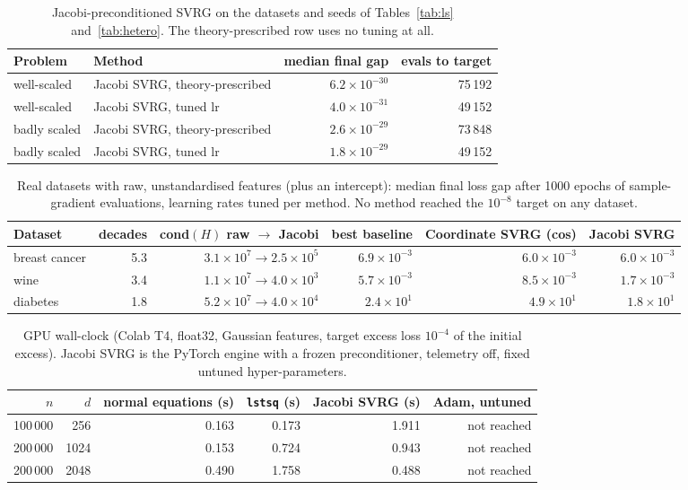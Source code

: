 \begin{table}[h]
\centering
\small
\begin{tabular}{@{}llrr@{}}
\toprule
Problem & Method & median final gap & evals to target \\
\midrule
well-scaled & Jacobi SVRG, theory-prescribed & $6.2\times 10^{-30}$ & 75\,192 \\
well-scaled & Jacobi SVRG, tuned lr & $4.0\times 10^{-31}$ & 49\,152 \\
badly scaled & Jacobi SVRG, theory-prescribed & $2.6\times 10^{-29}$ & 73\,848 \\
badly scaled & Jacobi SVRG, tuned lr & $1.8\times 10^{-29}$ & 49\,152 \\
\bottomrule
\end{tabular}
\caption{Jacobi-preconditioned SVRG on the datasets and seeds of Tables~\ref{tab:ls} and~\ref{tab:hetero}. The theory-prescribed row uses no tuning at all.}
\label{tab:jacobi}
\end{table}

\begin{table}[h]
\centering
\small
\begin{tabular}{@{}lrrrrr@{}}
\toprule
Dataset & decades & cond$(H)$ raw $\to$ Jacobi & best baseline & Coordinate SVRG (cos) & Jacobi SVRG \\
\midrule
breast cancer & 5.3 & $3.1\times 10^{7}\to 2.5\times 10^{5}$ & $6.9\times 10^{-3}$ & $6.0\times 10^{-3}$ & $6.0\times 10^{-3}$ \\
wine & 3.4 & $1.1\times 10^{7}\to 4.0\times 10^{3}$ & $5.7\times 10^{-3}$ & $8.5\times 10^{-3}$ & $1.7\times 10^{-3}$ \\
diabetes & 1.8 & $5.2\times 10^{7}\to 4.0\times 10^{4}$ & $2.4\times 10^{1}$ & $4.9\times 10^{1}$ & $1.8\times 10^{1}$ \\
\bottomrule
\end{tabular}
\caption{Real datasets with raw, unstandardised features (plus an intercept): median final loss gap after 1000 epochs of sample-gradient evaluations, learning rates tuned per method. No method reached the $10^{-8}$ target on any dataset.}
\label{tab:real}
\end{table}

\begin{table}[h]
\centering
\small
\begin{tabular}{@{}rrrrrr@{}}
\toprule
$n$ & $d$ & normal equations (s) & \texttt{lstsq} (s) & Jacobi SVRG (s) & Adam, untuned \\
\midrule
100\,000 & 256 & 0.163 & 0.173 & 1.911 & not reached \\
200\,000 & 1024 & 0.153 & 0.724 & 0.943 & not reached \\
200\,000 & 2048 & 0.490 & 1.758 & 0.488 & not reached \\
\bottomrule
\end{tabular}
\caption{GPU wall-clock (Colab T4, float32, Gaussian features, target excess loss $10^{-4}$ of the initial excess). Jacobi SVRG is the PyTorch engine with a frozen preconditioner, telemetry off, fixed untuned hyper-parameters.}
\label{tab:gpu}
\end{table}
